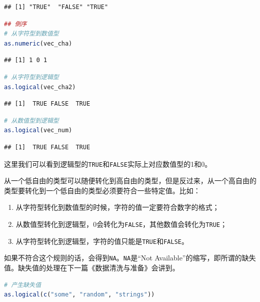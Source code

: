 \documentclass[]{ctexbook}
\providecommand{\tightlist}{%
  \setlength{\itemsep}{0pt}\setlength{\parskip}{0pt}}
\newcommand{\passthrough}[1]{#1}
\begin{document}
\begin{lstlisting}
## [1] "TRUE"  "FALSE" "TRUE"
\end{lstlisting}

\begin{lstlisting}[language=R]
## 倒序
# 从字符型到数值型
as.numeric(vec_cha)
\end{lstlisting}

\begin{lstlisting}
## [1] 1 0 1
\end{lstlisting}

\begin{lstlisting}[language=R]
# 从字符型到逻辑型
as.logical(vec_cha2)
\end{lstlisting}

\begin{lstlisting}
## [1]  TRUE FALSE  TRUE
\end{lstlisting}

\begin{lstlisting}[language=R]
# 从数值型到逻辑型
as.logical(vec_num)
\end{lstlisting}

\begin{lstlisting}
## [1]  TRUE FALSE  TRUE
\end{lstlisting}

这里我们可以看到逻辑型的\passthrough{\lstinline!TRUE!}和\passthrough{\lstinline!FALSE!}实际上对应数值型的1和0。

从一个低自由的类型可以随便转化到高自由的类型，但是反过来，从一个高自由的类型要转化到一个低自由的类型必须要符合一些特定值。比如：

\begin{enumerate}
\def\labelenumi{\arabic{enumi}.}
\tightlist
\item
  从字符型转化到数值型的时候，字符的值一定要符合数字的格式；
\item
  从数值型转化到逻辑型，0会转化为\passthrough{\lstinline!FALSE!}，其他数值会转化为\passthrough{\lstinline!TRUE!}；
\item
  从字符型转化到逻辑型，字符的值只能是\passthrough{\lstinline!TRUE!}和\passthrough{\lstinline!FALSE!}。
\end{enumerate}

如果不符合这个规则的话，会得到\passthrough{\lstinline!NA!}。\passthrough{\lstinline!NA!}是``Not Available''的缩写，即所谓的缺失值。缺失值的处理在下一篇《数据清洗与准备》会讲到。

\begin{lstlisting}[language=R]
# 产生缺失值
as.logical(c("some", "random", "strings"))
\end{lstlisting}
\end{document}

